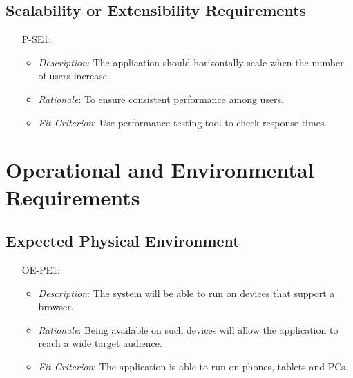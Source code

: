 \documentclass[12pt]{article}
\begin{document}
\subsection{Scalability or Extensibility Requirements}


\noindent \begin{itemize}
    \item[P-SE1:] 
        \begin{itemize}
            \item \textit{Description}: The application should horizontally scale when the number of users increase.
            \item \textit{Rationale}: To ensure consistent performance among users.
            \item \textit{Fit Criterion}: Use performance testing tool to check response times.
        \end{itemize}
\end{itemize}



\section{Operational and Environmental Requirements}
\subsection{Expected Physical Environment}
\noindent \begin{itemize}
    \item[OE-PE1:] 
        \begin{itemize}
            \item \textit{Description}: The system will be able to run on devices that support a browser.
            \item \textit{Rationale}: Being available on such devices will allow the application to reach a wide target audience.
            \item \textit{Fit Criterion}: The application is able to run on phones, tablets and PCs.
        \end{itemize}
\end{itemize}


\end{document}

